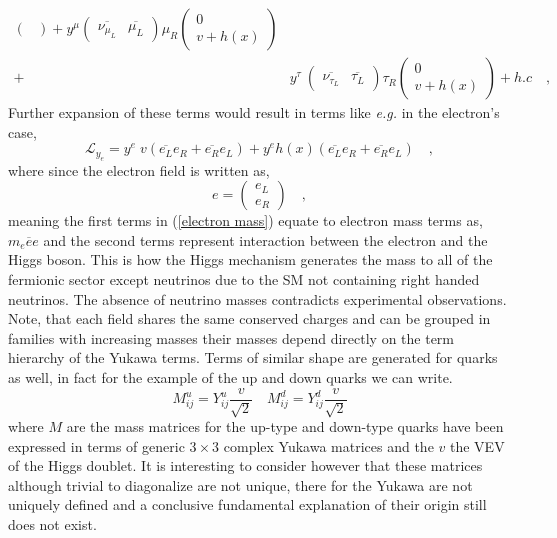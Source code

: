 \begin{align}
\begin{pmatrix}
\end{pmatrix} +
 y^\mu 
\begin{pmatrix}
\overline{\nu_{\mu_L}} & \overline{\mu_L} 
\end{pmatrix} \mu_R
\begin{pmatrix}
0 \\ v + h(x)
\end{pmatrix} \nonumber  \\  + & 
 y^\tau \
\begin{pmatrix}
\overline{\nu_{\tau_L}} & \overline{\tau_L} 
\end{pmatrix} \tau_R 
\begin{pmatrix}
0 \\ v + h(x)
\end{pmatrix} +  h.c  \nonumber \quad , 
\end{align}
%
Further expansion of these terms would result in terms like \textit{e.g.} in the electron's case,  
%
\begin{equation}
\mathcal{L}_{y_e} = y^e \; v \left( \overline{e_L} e_R + \overline{e_R} e_L \right) +  y^e h(x) \left( \overline{e_L} e_R + \overline{e_R} e_L \right) \quad , 
\label{electron mass}
\end{equation}
%
where since the electron field is written as, 
% 
\begin{equation}
e=\begin{pmatrix}
e_L \\
e_R 
\end{pmatrix} \quad , 
\end{equation}
%
meaning the first terms in (\ref{electron mass}) equate to electron mass terms as, $m_e \overline{e} e $ and the second terms represent interaction between the electron and the Higgs boson.  
%
This is how the Higgs mechanism generates the mass to all of the fermionic sector except neutrinos due to the SM not containing right handed neutrinos. The absence of neutrino masses contradicts experimental observations. Note, that each field shares the same conserved charges and can be grouped in families with increasing masses their masses depend directly on the term hierarchy of the Yukawa terms. Terms of similar shape are generated for quarks as well, in fact for the example of the up and down quarks we can write. 
%
%
\begin{equation}
M^u_{ij} = Y^u_{ij} \frac{v}{\sqrt{2}} \quad M^d_{ij} = Y^d_{ij} \frac{v}{\sqrt{2}}
\end{equation}
%
where $M$ are the mass matrices for the up-type and down-type quarks have been expressed in terms of generic $3 \times 3$ complex Yukawa matrices and the $v$ the VEV of the Higgs doublet. It is interesting to consider however that these matrices although trivial to diagonalize are not unique, there for the Yukawa are not uniquely defined and a conclusive fundamental explanation of their origin still does not exist.

